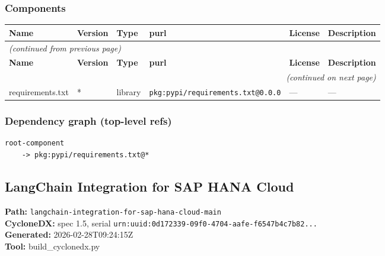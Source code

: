 \documentclass[11pt,a4paper]{article}
\begin{document}
\subsubsection*{Components}
\begin{longtable}{|p{4cm}|p{2cm}|p{1.6cm}|p{5cm}|p{1.5cm}|p{3.5cm}|}
\toprule
\rowcolor{sbomhdr}\textbf{Name} & \textbf{Version} & \textbf{Type} & \textbf{purl} & \textbf{License} & \textbf{Description} \\
\midrule
\endfirsthead
\multicolumn{6}{l}{\small\itshape (continued from previous page)} \\
\toprule
\rowcolor{sbomhdr}\textbf{Name} & \textbf{Version} & \textbf{Type} & \textbf{purl} & \textbf{License} & \textbf{Description} \\
\midrule
\endhead
\midrule
\multicolumn{6}{r}{\small\itshape (continued on next page)} \\
\endfoot
\bottomrule
\endlastfoot
\raggedright requirements.txt & * & library & \small\texttt{pkg:pypi/requirements.txt@0.0.0} & — & \small — \\
\end{longtable}

\subsubsection*{Dependency graph (top-level refs)}
\begin{lstlisting}[style=depgraph]
  root-component
    -> pkg:pypi/requirements.txt@*
\end{lstlisting}

\subsection{LangChain Integration for SAP HANA Cloud}
\textbf{Path:} \texttt{langchain-integration-for-sap-hana-cloud-main}
\\ \textbf{CycloneDX:} spec 1.5, serial \texttt{urn:uuid:0d172339-09f0-4704-aafe-f6547b4c7b82...}
\\ \textbf{Generated:} 2026-02-28T09:24:15Z
\\ \textbf{Tool:} build\_cyclonedx.py
\end{document}

